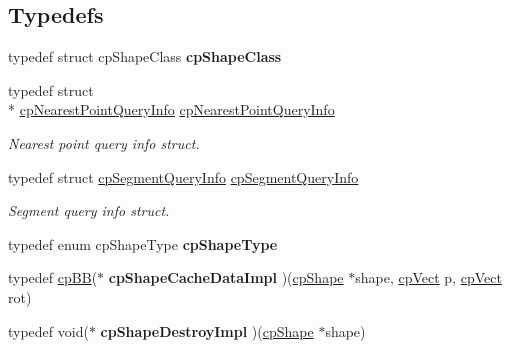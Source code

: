 \subsection*{Typedefs}
\begin{DoxyCompactItemize}
\item 
\hypertarget{group__cp_shape_ga1038324983fb53972888bdbcc4220a81}{typedef struct cp\-Shape\-Class {\bfseries cp\-Shape\-Class}}\label{group__cp_shape_ga1038324983fb53972888bdbcc4220a81}

\item 
\hypertarget{group__cp_shape_ga41529ef31034f2fa03d93203211d1ec3}{typedef struct \\*
\hyperlink{structcp_nearest_point_query_info}{cp\-Nearest\-Point\-Query\-Info} \hyperlink{group__cp_shape_ga41529ef31034f2fa03d93203211d1ec3}{cp\-Nearest\-Point\-Query\-Info}}\label{group__cp_shape_ga41529ef31034f2fa03d93203211d1ec3}

\begin{DoxyCompactList}\small\item\em Nearest point query info struct. \end{DoxyCompactList}\item 
\hypertarget{group__cp_shape_gadebeb6b5e42d369df368fd220aacd7e8}{typedef struct \hyperlink{structcp_segment_query_info}{cp\-Segment\-Query\-Info} \hyperlink{group__cp_shape_gadebeb6b5e42d369df368fd220aacd7e8}{cp\-Segment\-Query\-Info}}\label{group__cp_shape_gadebeb6b5e42d369df368fd220aacd7e8}

\begin{DoxyCompactList}\small\item\em Segment query info struct. \end{DoxyCompactList}\item 
\hypertarget{group__cp_shape_gaf3b57024d5274acf6e777e44843d1c79}{typedef enum cp\-Shape\-Type {\bfseries cp\-Shape\-Type}}\label{group__cp_shape_gaf3b57024d5274acf6e777e44843d1c79}

\item 
\hypertarget{group__cp_shape_gab8535aa43d884033c0e070b10a2eea09}{typedef \hyperlink{structcp_b_b}{cp\-B\-B}($\ast$ {\bfseries cp\-Shape\-Cache\-Data\-Impl} )(\hyperlink{structcp_shape}{cp\-Shape} $\ast$shape, \hyperlink{structcp_vect}{cp\-Vect} p, \hyperlink{structcp_vect}{cp\-Vect} rot)}\label{group__cp_shape_gab8535aa43d884033c0e070b10a2eea09}

\item 
\hypertarget{group__cp_shape_gae59221f927147fd1703d5bfb3c55dc68}{typedef void($\ast$ {\bfseries cp\-Shape\-Destroy\-Impl} )(\hyperlink{structcp_shape}{cp\-Shape} $\ast$shape)}\label{group__cp_shape_gae59221f927147fd1703d5bfb3c55dc68}


\end{DoxyCompactItemize}
